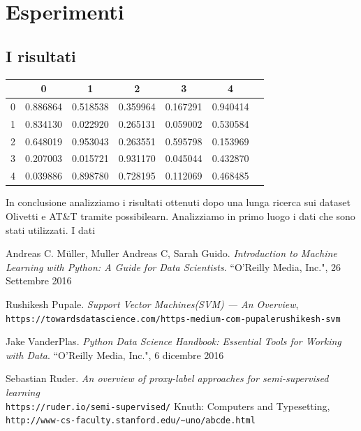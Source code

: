 \documentclass[12pt,italian]{report}
\begin{document}
\chapter{Esperimenti}

\section{I risultati}
\begin{tabular}{|l|c|c|c|c|c|c|}
	\hline
	{} &         0 &         1 &         2 &         3 &         4 \\
	\hline
	0 &  0.886864 &  0.518538 &  0.359964 &  0.167291 &  0.940414 \\
	1 &  0.834130 &  0.022920 &  0.265131 &  0.059002 &  0.530584 \\
	2 &  0.648019 &  0.953043 &  0.263551 &  0.595798 &  0.153969 \\
	3 &  0.207003 &  0.015721 &  0.931170 &  0.045044 &  0.432870 \\
	4 &  0.039886 &  0.898780 &  0.728195 &  0.112069 &  0.468485 \\
	\hline
\end{tabular}
In conclusione analizziamo i risultati ottenuti dopo una lunga ricerca sui dataset Olivetti e AT\&T tramite possibilearn. Analizziamo in primo luogo i dati che sono stati utilizzati. I dati

\begin{thebibliography}{9}
	Andreas C. Müller, Muller Andreas C, Sarah Guido. 
	\textit{Introduction to Machine Learning with Python: A Guide for Data Scientists}. 
	``O'Reilly Media, Inc.", 26 Settembre 2016
	
 	Rushikesh Pupale. \textit{Support Vector Machines(SVM) — An Overview}, \\\texttt{https://towardsdatascience.com/https-medium-com-pupalerushikesh-svm}
 	
 	Jake VanderPlas. 
 	\textit{Python Data Science Handbook: Essential Tools for Working with Data}. 
 	``O'Reilly Media, Inc.", 6 dicembre 2016

 	Sebastian Ruder. \textit{An overview of proxy-label approaches for semi-supervised learning}
 	\\\texttt{https://ruder.io/semi-supervised/}
	Knuth: Computers and Typesetting,
	\\\texttt{http://www-cs-faculty.stanford.edu/\~{}uno/abcde.html}
\end{thebibliography}
\end{document}
